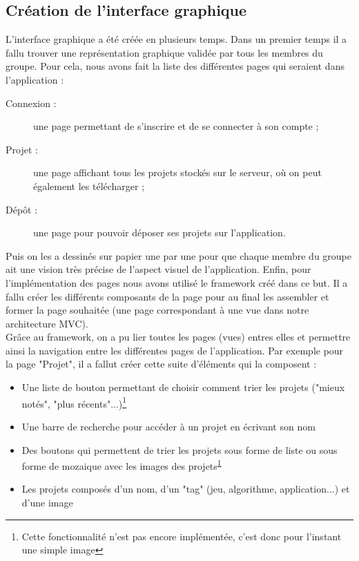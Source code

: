 \documentclass{report}
\begin{document}
\subsection{Création de l'interface graphique}
L'interface graphique a été créée en plusieurs temps. Dans un premier temps il a fallu trouver une représentation graphique validée par tous les membres du groupe. Pour cela, nous avons fait la liste des différentes pages qui seraient dans l'application :
\begin{description}
    \item[Connexion :] une page permettant de s'inscrire et de se connecter à son compte ;
    \item[Projet :] une page affichant tous les projets stockés sur le serveur, où on peut également les télécharger ;
    \item[Dépôt :] une page pour pouvoir déposer ses projets sur l'application.
\end{description}
Puis on les a dessinés sur papier une par une pour que chaque membre du groupe ait une vision très précise de l'aspect visuel de l'application.
Enfin, pour l'implémentation des pages nous avons utilisé le framework créé dans ce but. Il a fallu créer les différents composants de la page pour au final les assembler et former la page souhaitée (une page correspondant à une vue dans notre architecture MVC). \\
Grâce au framework, on a pu lier toutes les pages (vues) entres elles et permettre ainsi la navigation entre les différentes pages de l'application.
Par exemple pour la page "Projet", il a fallut créer cette suite d'éléments qui la composent :
\begin{itemize}[label=$-$]
    \item Une liste de bouton permettant de choisir comment trier les projets ("mieux notés", "plus récents"...)\footnote{\label{note}Cette fonctionnalité n'est pas encore implémentée, c'est donc pour l'instant une simple image}
    \item Une barre de recherche pour accéder à un projet en écrivant son nom
    \item Des boutons qui permettent de trier les projets sous forme de liste ou sous forme de mozaique avec les images des projets\textsuperscript{\ref{note}}
    \item Les projets composés d'un nom, d'un "tag" (jeu, algorithme, application...) et d'une image
\end{itemize}
\end{document}
